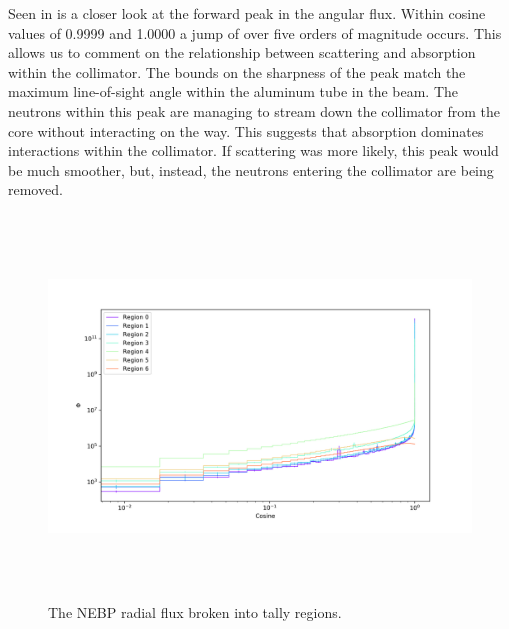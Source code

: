 Seen in  is a closer look at the forward peak in the angular flux.
Within cosine values of 0.9999 and 1.0000 a jump of over five orders of magnitude occurs.
This allows us to comment on the relationship between scattering and absorption within the collimator.
The bounds on the sharpness of the peak match the maximum line-of-sight angle within the aluminum tube in the beam.
The neutrons within this peak are managing to stream down the collimator from the core without interacting on the way.
This suggests that absorption dominates interactions within the collimator.
If scattering was more likely, this peak would be much smoother, but, instead, the neutrons entering the collimator are being removed.


\begin{figure}[htb]
\centering
\includegraphics[height=4in]{tex/figures/flux_rad_cos.png}
\caption[Regional Flux vs. Angle]{The NEBP radial flux broken into tally regions.}
\label{fig:flux_rad_cos}
\end{figure}

